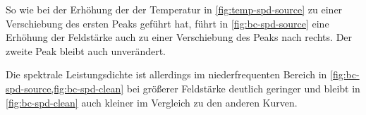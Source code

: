 \documentclass[main.tex]{subfiles}
\begin{document}
So wie bei der Erhöhung der der Temperatur in \cref{fig:temp-spd-source} zu einer Verschiebung des ersten Peaks geführt hat, führt in  \cref{fig:bc-spd-source} eine Erhöhung der Feldstärke auch zu einer Verschiebung des Peaks nach rechts. Der zweite Peak bleibt auch unverändert.

Die spektrale Leistungsdichte ist allerdings im niederfrequenten Bereich in \cref{fig:bc-spd-source,fig:bc-spd-clean} bei größerer Feldstärke deutlich geringer und bleibt in \cref{fig:bc-spd-clean} auch kleiner im Vergleich zu den anderen Kurven.


\begin{figure}[H]
    \centering

\end{figure}
\end{document}
